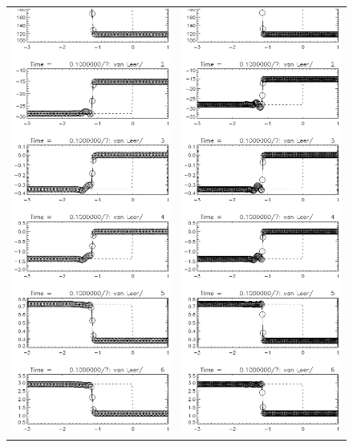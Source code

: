 \documentclass[10.5pt
]{article}
\begin{document}
\begin{figure}
\begin{center}
\begin{tabular}{cc}
\includegraphics[width=.45\textwidth]{WFast077.eps} &
\includegraphics[width=.45\textwidth]{WFast261.eps}

\end{tabular}
\end{center}
\end{figure}
\end{document}

